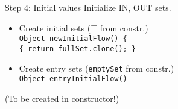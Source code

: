 





\begin{slide}{Step 4: Initial values}
\vspace*{-0.1in}
Initialize IN, OUT sets.
\begin{itemize}

\item Create initial sets ($\top$ from constr.)\\
{\tt Object newInitialFlow() \{\\
\qquad \tt \{ return fullSet.clone(); \} }

\vspace*{0.1in}

\item Create entry sets ({\tt emptySet} from constr.)\\
{\tt Object entryInitialFlow()}\\
\end{itemize}

(To be created in constructor!)
\end{slide}

